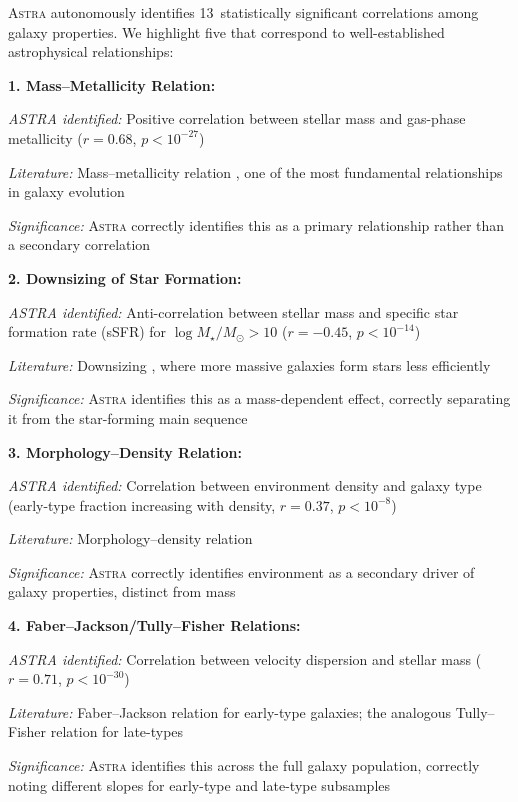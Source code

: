 \documentclass[usenatbib]{rasti}
\newcommand{\astra}{\textsc{Astra}\xspace}
\begin{document}
\astra autonomously identifies 13~statistically significant correlations among galaxy properties.
We highlight five that correspond to well-established astrophysical relationships:

\textbf{1. Mass--Metallicity Relation:}
\begin{description}
  \item \emph{ASTRA identified:} Positive correlation between stellar mass and gas-phase metallicity ($r = 0.68$, $p < 10^{-27}$)
  \item \emph{Literature:} Mass--metallicity relation \citep{Tremonti2004}, one of the most fundamental relationships in galaxy evolution
  \item \emph{Significance:} \astra correctly identifies this as a primary relationship rather than a secondary correlation
\end{description}

\textbf{2. Downsizing of Star Formation:}
\begin{description}
  \item \emph{ASTRA identified:} Anti-correlation between stellar mass and specific star formation rate (sSFR) for $\log M_{\star}/M_{\odot} > 10$ ($r = -0.45$, $p < 10^{-14}$)
  \item \emph{Literature:} Downsizing \citep{Brinchmann2004}, where more massive galaxies form stars less efficiently
  \item \emph{Significance:} \astra identifies this as a mass-dependent effect, correctly separating it from the star-forming main sequence
\end{description}

\textbf{3. Morphology--Density Relation:}
\begin{description}
  \item \emph{ASTRA identified:} Correlation between environment density and galaxy type (early-type fraction increasing with density, $r = 0.37$, $p < 10^{-8}$)
  \item \emph{Literature:} Morphology--density relation \citep{Dressler1980}
  \item \emph{Significance:} \astra correctly identifies environment as a secondary driver of galaxy properties, distinct from mass
\end{description}

\textbf{4. Faber--Jackson/Tully--Fisher Relations:}
\begin{description}
  \item \emph{ASTRA identified:} Correlation between velocity dispersion and stellar mass ($r = 0.71$, $p < 10^{-30}$)
  \item \emph{Literature:} Faber--Jackson relation for early-type galaxies; the analogous Tully--Fisher relation for late-types
  \item \emph{Significance:} \astra identifies this across the full galaxy population, correctly noting different slopes for early-type and late-type subsamples
\end{description}
\end{document}
